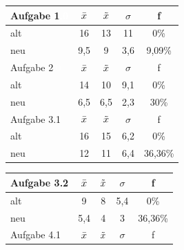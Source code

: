 \begin{table}[H]
\justifying
\begin{tabular}{|l|c|c|c|c|}
\hline
Aufgabe 1\textcolor{white}{.0}   & $\Bar{x}$ & $\Tilde{x}$ & $\sigma$ & f \\ \hline
alt                              & 16        &  13         &  11      &  0\%   \\ \hline
neu                              & 9,5       &  9          &  3,6     &  9,09\%   \\ \hline
\hline
Aufgabe 2\textcolor{white}{.0}   & $\Bar{x}$ & $\Tilde{x}$ & $\sigma$ & f \\ \hline
alt                              & 14        &  10         &  9,1  &  0\%   \\ \hline
neu                              & 6,5       &  6,5        &  2,3  &  30\%   \\ \hline
\hline
Aufgabe 3.1   & $\Bar{x}$ & $\Tilde{x}$ & $\sigma$ & f \\ \hline
alt           & 16        &  15         &  6,2  &  0\%   \\ \hline
neu           & 12        &  11         &  6,4  &  36,36\%   \\ \hline
\end{tabular}
\begin{tabular}{|l|c|c|c|c|}
\hline
Aufgabe 3.2   & $\Bar{x}$ & $\Tilde{x}$ & $\sigma$ & f \\ \hline
alt           & 9         &  8          &  5,4  &  0\%   \\ \hline
neu           & 5,4       &  4          &  3    &  36,36\%   \\ \hline
\hline
Aufgabe 4.1   & $\Bar{x}$ & $\Tilde{x}$ & $\sigma$ & f \\ \hline

\end{tabular}
\end{table}
